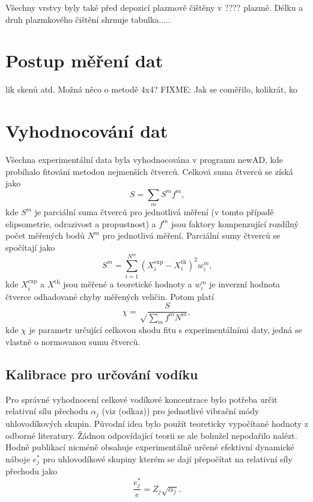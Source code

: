Všechny vrstvy byly také před depozicí plazmově čištěny v ???? plazmě. Délku a druh plazmkového čištění shrnuje tabulka.....

\section{Postup měření dat}lik skenů atd. Možná něco o metodě 4x4?
FIXME: Jak se coměřilo, kolikrát, ko

\section{Vyhodnocování dat}
Všechna experimentální data byla vyhodnocována v programu newAD, kde probíhalo fitování metodou nejmenších čtverců. Celková suma čtverců se získá jako
%
\begin{equation} S = \sum_m S^m f^m \text{,}\end{equation}
%
kde $S^m$ je parciální suma čtverců pro jednotlivá měření (v tomto případě elipsometrie, odrazivost a propustnost) a $f^m$ jsou faktory kompenzující rozdílný počet měřených bodů $N^m$ pro jednotlivá měření. Parciální sumy čtverců se spočítají jako
%
\begin{equation} S^m = \sum_{i=1}^{N^m} (X_i^\mathrm{exp} - X_i^\mathrm{th})^2 w_i^m \text{,} \end{equation}
%
kde $X_i^\mathrm{exp}$ a $X^\mathrm{th}$ jsou měřené a teoretické hodnoty a $w_i^m$ je inverzní hodnota čtverce odhadované chyby měřených veličin. Potom platí \cite{Franta2011}
%
\begin{equation} \chi = \sqrt \frac{S}{\sum_m f^m N^m} \mathrm{,}\end{equation}
kde $\chi$ je parametr určující celkovou shodu fitu s experimentálními daty, jedná se vlastně o normovanou sumu čtverců.

\subsection{Kalibrace pro určování vodíku}
Pro správné vyhodnocení celkové vodíkové koncentrace bylo potřeba určit relativní sílu přechodu $\alpha_j$ (viz (odkaz)) pro jednotlivé vibrační módy uhlovodíkových skupin. Původní idea bylo použít teoreticky vypočítané hodnoty z odborné literatury. Žádnou odpovídající teorii se ale bohužel nepodařilo nalézt. Hodně publikací nicméně obsahuje experimentálně určené efektivní dynamické náboje $e_j^*$ pro uhlovodíkové skupiny kterém se dají přepočítat na relativní síly přechodu jako \cite{sumrule2}
\begin{equation}
\frac{e_j^*}{e} = Z_j \sqrt{\alpha_j} \text{.}
\end{equation}

